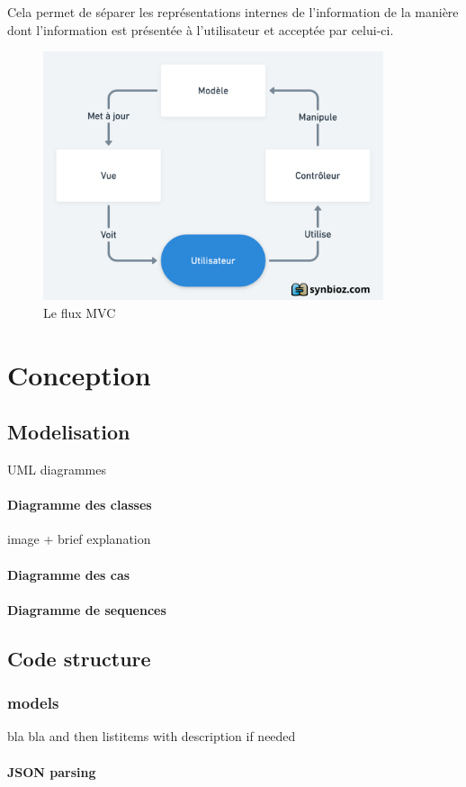 \documentclass[a4paper, 10p]{report}
\begin{document}
Cela permet de séparer les représentations internes de l'information de la manière dont l'information est présentée à l'utilisateur et acceptée par celui-ci.
\begin{figure}[!h]
  \center
  \includegraphics[width=10cm]{mvc.png}
  \caption{Le flux MVC}
  \label{fig:fluxmvc}
\end{figure}

\newpage
\chapter{Conception}
	\section{Modelisation} UML diagrammes
		\subsubsection{Diagramme des classes} image + brief explanation
		\subsubsection{Diagramme des cas}
		\subsubsection{Diagramme de sequences}
	\section{Code structure}
		\subsection{models} %
			bla bla and then listitems with description if needed
			\subsubsection{JSON parsing}
\end{document}
